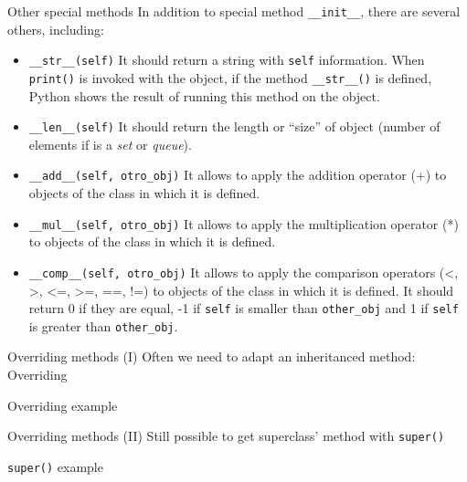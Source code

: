 \documentclass[10pt,compress]{beamer} %
\begin{document}
\begin{frame}{Other special methods}
In addition to special method \texttt{\_\_init\_\_}, there are several others, including:\\
	\begin{block}{}
		\vspace{-0.15cm}
		\begin{itemize}
		\item \footnotesize{\texttt{\_\_str\_\_(self)} It should return a string with \texttt{self} information.  When \texttt{print()} is invoked with the object, if the method \texttt{\_\_str\_\_()} is defined, Python shows the result of running this method on the object.}
		\item \footnotesize{\texttt{\_\_len\_\_(self)} It should return the length or ``size'' of object (number of elements if is a \textit{set} or \textit{queue}).}
		\item \footnotesize{\texttt{\_\_add\_\_(self, otro\_obj)} It allows to apply the addition operator (+) to objects of the class in which it is defined.}
		\item \footnotesize{\texttt{\_\_mul\_\_(self, otro\_obj)} It allows to apply the multiplication operator (*) to objects of the class in which it is defined.}
		\item \footnotesize{\texttt{\_\_comp\_\_(self, otro\_obj)} It allows to apply the comparison operators (<, >, <=, >=, ==, !=) to objects of the class in which it is defined. It should return 0 if they are equal, -1 if \texttt {self} is smaller than \texttt{other\_obj} and 1 if \texttt{self} is greater than \texttt{other\_obj}.}
		\end{itemize}
		\vspace{-0.2cm}
	\end{block}	
\end{frame}


\begin{frame}[shrink]{Overriding methods (I)}
	Often we need to adapt an inheritanced method: \alert{Overriding}

	\begin{block}{Overriding example}
		\vspace{-0.2cm}
		
		\vspace{-0.2cm}
	\end{block}
\end{frame}
	
\begin{frame}{Overriding methods (II)}
		Still possible to get superclass' method with \texttt{super()}

	\begin{block}{\texttt{super()} example}
		\vspace{-0.2cm}
		
		\vspace{-0.2cm}
	\end{block}
\end{frame}
\end{document}
